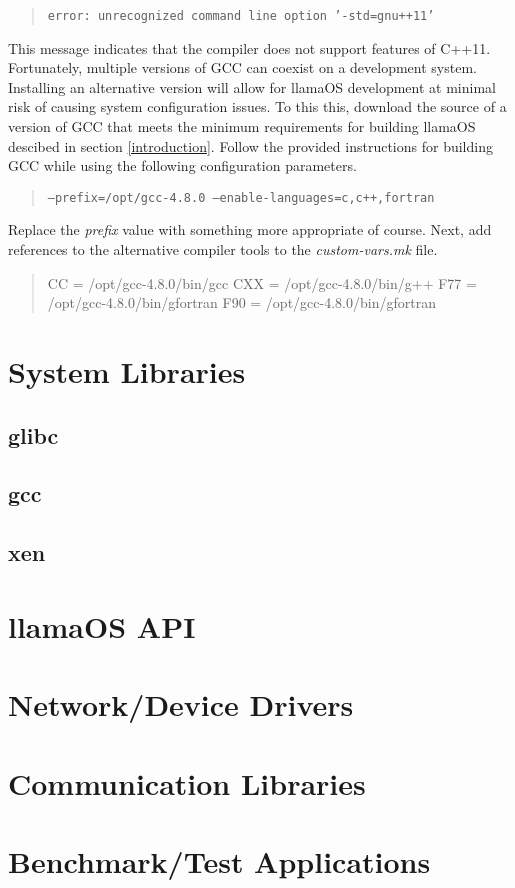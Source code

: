 \documentclass[draft]{article}
\begin{document}
\begin{quote}
\texttt{error: unrecognized command line option '-std=gnu++11'}
\end{quote}

This message indicates that the compiler does not support features of C++11.  
Fortunately, multiple versions of GCC can coexist on a development system.  
Installing an alternative version will allow for llamaOS development at 
minimal risk of causing system configuration issues.  To this this, download 
the source of a version of GCC that meets the minimum requirements for building 
llamaOS descibed in section \ref{introduction}.  Follow the provided 
instructions for building GCC while using the following configuration 
parameters.

\begin{quote}
\texttt{--prefix=/opt/gcc-4.8.0 --enable-languages=c,c++,fortran}
\end{quote}

Replace the \emph{prefix} value with something more appropriate of course.  
Next, add references to the alternative compiler tools to the 
\emph{custom-vars.mk} file.

\begin{quote}
CC = /opt/gcc-4.8.0/bin/gcc\newline
CXX = /opt/gcc-4.8.0/bin/g++\newline
F77 = /opt/gcc-4.8.0/bin/gfortran\newline
F90 = /opt/gcc-4.8.0/bin/gfortran
\end{quote}


\section{System Libraries}

\subsection{glibc}
\subsection{gcc}
\subsection{xen}

\section{llamaOS API}

\section{Network/Device Drivers}

\section{Communication Libraries}

\section{Benchmark/Test Applications}
\end{document}
